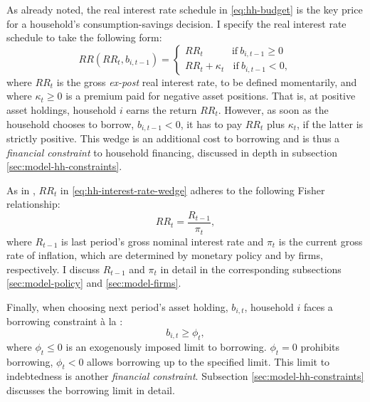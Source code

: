 \documentclass[a4paper,12pt]{article} %
\numberwithin{equation}{section} %
\numberwithin{figure}{section}
\numberwithin{table}{section}
\begin{document}
As already noted, the real interest rate schedule in \eqref{eq:hh-budget} is the key price for a household's consumption-savings decision. I specify the real interest rate schedule to take the following form:
\begin{equation}
    RR (RR_t, b_{i,t-1}) = \begin{cases}
	RR_t \ \ \ \ \ \ \ \ \ \ \ \ \ \text{if} \ b_{i,t-1} \ge 0 \\
	RR_t + \kappa_t \ \ \ \ \text{if} \ b_{i,t-1} < 0,
	\end{cases} \label{eq:hh-interest-rate-wedge}
\end{equation}
where $RR_t$ is the gross \textit{ex-post} real interest rate, to be defined momentarily, and where $\kappa_t \ge 0$ is a premium paid for negative asset positions. That is, at positive asset holdings, household $i$ earns the return $RR_t$. However, as soon as the household chooses to borrow, $b_{i,t-1} < 0$, it has to pay $RR_t$ plus $\kappa_t$, if the latter is strictly positive. This wedge is an additional cost to borrowing and is thus a \textit{financial constraint} to household financing, discussed in depth in subsection \ref{sec:model-hh-constraints}.

As in \textcite{auclert2021}, $RR_t$ in \eqref{eq:hh-interest-rate-wedge} adheres to the following Fisher relationship:
\begin{equation}
    RR_t = \frac{R_{t-1}}{\pi_t}, \label{eq:hh-fisher-equation}
\end{equation}
where $R_{t-1}$ is last period's gross nominal interest rate and $\pi_t$ is the current gross rate of inflation, which are determined by monetary policy and by firms, respectively. I discuss $R_{t-1}$ and $\pi_t$ in detail in the corresponding subsections \ref{sec:model-policy} and \ref{sec:model-firms}.

Finally, when choosing next period's asset holding, $b_{i,t}$, household $i$ faces a borrowing constraint à la \textcite{huggett1993}:
\begin{equation}
    b_{i,t} \ge \phi_t, \label{eq:borrowing-limit}
\end{equation}
where $\phi_t \le 0$ is an exogenously imposed limit to borrowing. $\phi_t = 0$ prohibits borrowing, $\phi_t < 0$ allows borrowing up to the specified limit. This limit to indebtedness is another \textit{financial constraint}. Subsection \ref{sec:model-hh-constraints} discusses the borrowing limit in detail.

\end{document}

